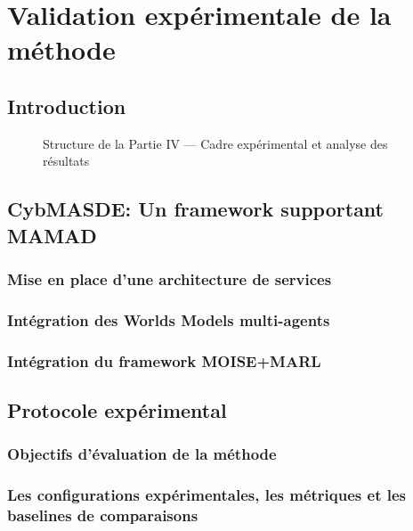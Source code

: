\documentclass[ twoside,openright,titlepage,numbers=noenddot,headinclude,%
                footinclude=true,cleardoublepage=empty,abstractoff, %
                BCOR=5mm,paper=a4,fontsize=11pt,%
                french,american,%
                ]{scrreprt}
\begin{document}
\cleardoublepage
{}
{}
\part{Validation expérimentale de la méthode}

\chapter*{Introduction}

\begin{figure}[h!]
    \centering
    
    \caption{Structure de la Partie IV — Cadre expérimental et analyse des résultats}
\end{figure}

\chapter{CybMASDE: Un framework supportant MAMAD}
\section{Mise en place d'une architecture de services}
\section{Intégration des Worlds Models multi-agents}
\section{Intégration du framework MOISE+MARL}

\chapter{Protocole expérimental}
\section{Objectifs d'évaluation de la méthode}
\section{Les configurations expérimentales, les métriques et les baselines de comparaisons}
\end{document}
